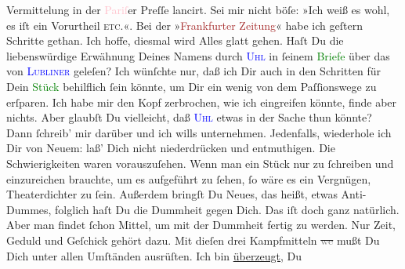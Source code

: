 \documentclass[twoside=false,titlepage=false,open=any, parskip=never, fontsize=12pt, headings=small, chapterprefix=false, appendixprefix=false]{scrbook}
\newcommand{\strikeout}[1]{\sout{#1}}
\newcommand{\pbposition}{\depth}
\newcommand{\pb}{\nobreak\hspace{0pt}\raisebox{-0.1em}{\raisebox{\pbposition}{\textnormal{|}}}\nobreak\hspace{0pt}}
\begin{document}
               Vermittelung in der \textcolor{pink}{Pariſ}{}\ledrightnote{\textcolor{pink}{Paris}}er Preſſe lancirt. Sei mir
               nicht böſe: »Ich weiß es wohl, es iſt ein Vorurtheil \textsc{etc.}«.\pend
           \pstart
           {\pb}Bei der »\textcolor{brown}{Frankfurter
                  Zeitung}{}\ledrightnote{\textcolor{brown}{Frankfurter Zeitung}}« habe ich geſtern Schritte gethan. Ich hoffe, diesmal wird Alles
               glatt gehen. Haſt Du die liebenswürdige Erwähnung Deines Namens durch \textsc{\textcolor{blue}{Uhl}{}\ledrightnote{\textcolor{blue}{Friedrich Uhl}}} in ſeinem \textcolor{green}{Briefe}{} über das \label{K_L02622-55v}\label{K_L02622-55h} von \textsc{\textcolor{blue}{Lubliner}{}\ledrightnote{\textcolor{blue}{Hugo Lubliner}}} geleſen?\pend
           \pstart
           Ich wünſchte nur, daß ich Dir auch in den Schritten für Dein \textcolor{green}{Stück}{} behilflich ſein könnte, um Dir ein wenig
               von dem Paſſionswege zu erſparen. Ich habe mir den Kopf zerbrochen, wie ich
               eingreifen könnte, finde aber nichts. Aber glaubſt Du vielleicht, daß {\pb}\textsc{\textcolor{blue}{Uhl}{}\ledrightnote{\textcolor{blue}{Friedrich Uhl}}} etwas in der Sache thun könnte? Dann ſchreib’ mir darüber und
               ich wills unternehmen. Jedenfalls, wiederhole ich Dir von Neuem: laß’ Dich nicht
               niederdrücken und entmuthigen. Die Schwierigkeiten waren vorauszuſehen. Wenn man ein
               Stück nur zu ſchreiben und einzureichen brauchte, um es aufgeführt zu ſehen, ſo wäre
               es ein Vergnügen, Theaterdichter zu ſein. Außerdem bringſt Du Neues, das heißt, etwas
               Anti-Dummes, folglich haſt Du die Dummheit gegen Dich. Das iſt doch ganz natürlich.
               Aber man findet ſchon Mittel, {\pb}um mit der Dummheit
               fertig zu werden. Nur Zeit, Geduld und Geſchick gehört dazu. Mit dieſen drei
               Kampfmitteln \strikeout{\textcolor{gray}{we}} mußt Du Dich unter
               allen Umſtänden ausrüſten. Ich bin \uline{überzeugt}, Du
\end{document}

